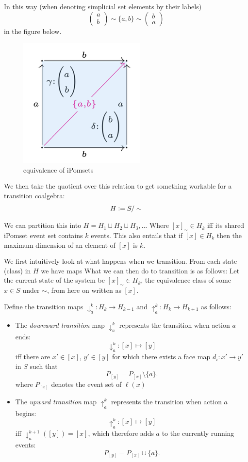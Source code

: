 \documentclass[12pt]{article}
\newcommand{\defeq}{\vcentcolon=}
\newcommand{\1}{\mathbbm{1}}
\begin{document}
In this way (when denoting simplicial set elements by their labels)\[
\begin{pmatrix} a \\ b \end{pmatrix}
\sim 
\{a,b\}
\sim
\begin{pmatrix} b \\ a \end{pmatrix}
\]
 in the figure below.
\begin{figure}[h]
    \centering
    \includegraphics[width=0.3\linewidth]{image.png}
    \caption{equivalence of iPomsets}
    \label{fig:ipomset-equivalence}
\end{figure}

We then take the quotient over this relation to get something workable for a transition coalgebra:
\[
    H \defeq S/\sim
\]

We can partition this into $H = H_1 \sqcup H_2 \sqcup H_3, \dots$ Where $[x]_{\sim} \in H_k$ iff its shared iPomset event set contains $k$ events.
This also entails that if $[x]\in H_k$ then the maximum dimension of an element of $[x]$ is $k$.

We first intuitively look at what happens when we transition. From each state (class) in $H$ we have maps 
What we can then do to transition is as follows:
Let the current state of the system be $[x]_{\sim}\in H_k$, the equivalence class of some $x\in S$ under $\sim$, from here on written as $[x]$.
\newpage

Define the transition maps $\downarrow_a^k: H_k\to H_{k-1}$ and $\uparrow_a^k: H_k \to H_{k+1}$ as follows:

\begin{itemize}
    \item The \textit{downward transition} map $\downarrow_a^k$ represents the transition when action $a$ ends:
    \[
    \downarrow_a^k: [x] \mapsto [y]
    \]
    iff there are $x'\in [x]$, $y'\in [y]$ for which there exists a face map $d_i: x' \to y'$ in $S$ such that
    \[
    P_{[y]} = P_{[x]} \setminus \{a\}.
    \]
    where $P_{[x]}$ denotes the event set of $\ell(x)$
    
    \item The \textit{upward transition} map $\uparrow_a^k$ represents the transition when action $a$ begins:
    \[
    \uparrow_a^k: [x] \mapsto [y]
    \]
    iff $\downarrow_a^{k+1}([y]) = [x]$, which therefore adds $a$ to the currently running events: 
    \[
    P_{[y]} = P_{[x]} \cup \{a\}.
    \]
\end{itemize}
\end{document}
